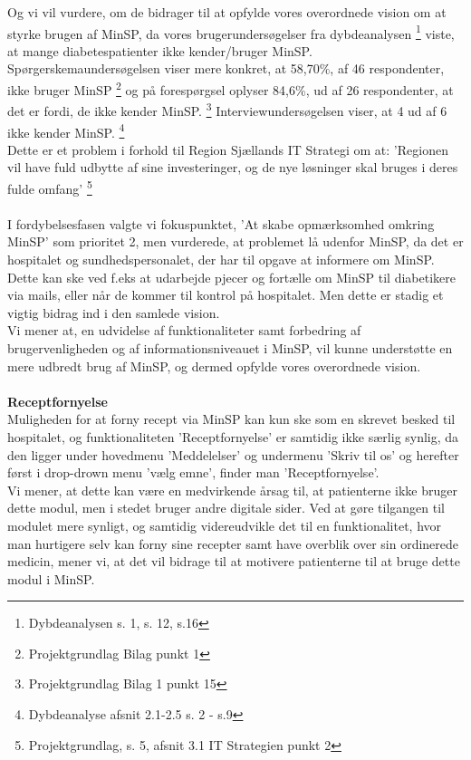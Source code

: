 Og vi vil vurdere,
 om de bidrager til at opfylde vores overordnede vision om at styrke brugen af MinSP, da vores brugerundersøgelser fra dybdeanalysen \footnote{Dybdeanalysen s. 1, s. 12, s.16} viste, at mange diabetespatienter ikke kender/bruger MinSP. 
Spørgerskemaundersøgelsen viser mere konkret, at 58,70\%, af 46 respondenter, ikke bruger MinSP \footnote{Projektgrundlag Bilag punkt 1} og på forespørgsel oplyser 84,6\%, ud af 26 respondenter, at det er fordi, de ikke kender MinSP. \footnote{Projektgrundlag Bilag 1 punkt 15} Interviewundersøgelsen viser, at 4 ud af 6 ikke kender MinSP. \footnote{Dybdeanalyse afsnit 2.1-2.5 s. 2 - s.9}\\
Dette er et problem i forhold til Region Sjællands IT Strategi om at: 'Regionen vil have fuld udbytte af sine investeringer, og de nye løsninger skal bruges i deres fulde omfang' \footnote{Projektgrundlag, s. 5, afsnit 3.1 IT Strategien punkt 2}\\
\\
I fordybelsesfasen valgte vi fokuspunktet, 'At skabe opmærksomhed omkring MinSP' som prioritet 2, men vurderede, at problemet lå udenfor MinSP, da det er hospitalet og sundhedspersonalet, der har til opgave at informere om MinSP. Dette kan ske ved f.eks at udarbejde pjecer og fortælle om MinSP til diabetikere via mails, eller når de kommer til kontrol på hospitalet. Men dette er stadig et vigtig bidrag ind i den samlede vision. \\
Vi mener at, en udvidelse af funktionaliteter samt forbedring af brugervenligheden og af informationsniveauet i MinSP, vil kunne understøtte en mere udbredt brug af MinSP, og dermed opfylde vores overordnede vision.
\\\\
\textbf{Receptfornyelse}\\
Muligheden for at forny recept via MinSP kan kun ske som en skrevet besked til hospitalet, og funktionaliteten 'Receptfornyelse' er samtidig ikke særlig synlig, da den ligger under hovedmenu 'Meddelelser' og undermenu 'Skriv til os' og herefter først i drop-drown menu 'vælg emne', finder man 'Receptfornyelse'.\\
Vi mener, at dette kan være en medvirkende årsag til, at patienterne ikke bruger dette modul, men i stedet bruger andre digitale sider. Ved at gøre tilgangen til modulet mere synligt, og samtidig videreudvikle det til en funktionalitet, hvor man hurtigere selv kan forny sine recepter samt have overblik over sin ordinerede medicin, mener vi, at det vil bidrage til at motivere patienterne til at bruge dette modul i MinSP.\\
